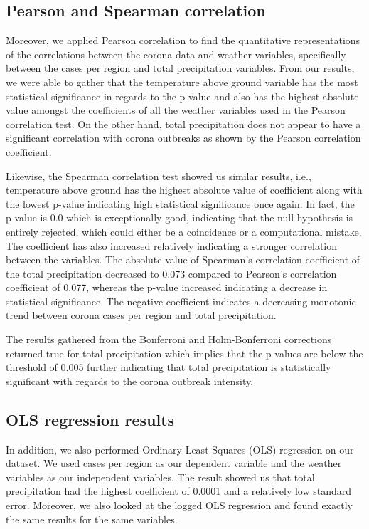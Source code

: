 \subsection{Pearson and Spearman correlation}
Moreover, we applied Pearson correlation to find the quantitative representations of the correlations between the corona data and weather variables, specifically between the cases per region and total precipitation variables. From our results, we were able to gather that the temperature above ground variable has the most statistical significance in regards to the p-value and also has the highest absolute value amongst the coefficients of all the weather variables used in the Pearson correlation test. On the other hand, total precipitation does not appear to have a significant correlation with corona outbreaks as shown by the Pearson correlation coefficient.

Likewise, the Spearman correlation test showed us similar results, i.e., temperature above ground has the highest absolute value of coefficient along with the lowest p-value indicating high statistical significance once again. In fact, the p-value is 0.0 which is exceptionally good, indicating that the null hypothesis is entirely rejected, which could either be a coincidence or a computational mistake. The coefficient has also increased relatively indicating a stronger correlation between the variables. The absolute value of Spearman's correlation coefficient of the total precipitation decreased to 0.073 compared to Pearson's correlation coefficient of 0.077, whereas the p-value increased indicating a decrease in statistical significance. The negative coefficient indicates a decreasing monotonic trend between corona cases per region and total precipitation.

The results gathered from the Bonferroni and Holm-Bonferroni corrections returned true for total precipitation which implies that the p values are below the threshold of 0.005 further indicating that total precipitation is statistically significant with regards to the corona outbreak intensity.

\subsection{OLS regression results}
In addition, we also performed Ordinary Least Squares (OLS) regression on our dataset. We used cases per region as our dependent variable and the weather variables as our independent variables. The result showed us that total precipitation had the highest coefficient of 0.0001 and a relatively low standard error. Moreover, we also looked at the logged OLS regression and found exactly the same results for the same variables.


